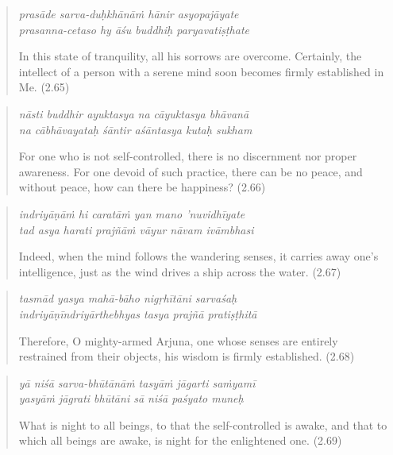 \documentclass[12pt, twoside, openright]{memoir}
\begin{document}
\par
\begin{verse}
\textit{prasāde sarva-duḥkhānāṁ hānir asyopajāyate} \\
\textit{prasanna-cetaso hy āśu buddhiḥ paryavatiṣṭhate}

\noindent In this state of tranquility, all his sorrows are overcome. Certainly, the intellect of a person with a serene mind soon becomes firmly established in Me. (2.65)
\end{verse}
\par



\par
\begin{verse}
\textit{nāsti buddhir ayuktasya na cāyuktasya bhāvanā} \\
\textit{na cābhāvayataḥ śāntir aśāntasya kutaḥ sukham}

\noindent For one who is not self-controlled, there is no discernment nor proper awareness. For one devoid of such practice, there can be no peace, and without peace, how can there be happiness? (2.66)
\end{verse}
\par



\par
\begin{verse}
\textit{indriyāṇāṁ hi caratāṁ yan mano ’nuvidhīyate} \\
\textit{tad asya harati prajñāṁ vāyur nāvam ivāmbhasi}

\noindent Indeed, when the mind follows the wandering senses, it carries away one’s intelligence, just as the wind drives a ship across the water. (2.67)
\end{verse}
\par



\par
\begin{verse}
\textit{tasmād yasya mahā-bāho nigṛhītāni sarvaśaḥ} \\
\textit{indriyāṇīndriyārthebhyas tasya prajñā pratiṣṭhitā}

\noindent Therefore, O mighty-armed Arjuna, one whose senses are entirely restrained from their objects, his wisdom is firmly established. (2.68)
\end{verse}
\par



\par
\begin{verse}
\textit{yā niśā sarva-bhūtānāṁ tasyāṁ jāgarti saṁyamī} \\
\textit{yasyāṁ jāgrati bhūtāni sā niśā paśyato muneḥ}

\noindent What is night to all beings, to that the self-controlled is awake, and that to which all beings are awake, is night for the enlightened one. (2.69)
\end{verse}
\par
\end{document}
